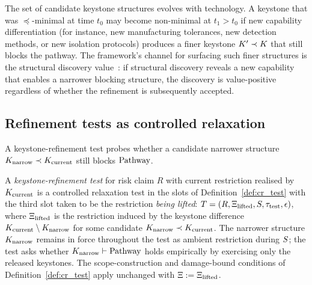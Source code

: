 \begin{remark}
\label{rem:technology_drift}
The set of candidate keystone structures evolves with technology.
A keystone that was $\preceq$-minimal at time $t_0$ may become
non-minimal at $t_1 > t_0$ if new capability differentiation
(for instance, new manufacturing tolerances, new detection
methods, or new isolation protocols) produces a finer keystone
$K' \prec K$ that still blocks the
pathway.  The framework's channel for surfacing such finer
structures is the structural discovery
value~\citep[Proposition~2]{lasser2026horizon}: if structural
discovery reveals a new capability that enables a narrower
blocking structure, the discovery is value-positive regardless of
whether the refinement is subsequently accepted.
\end{remark}

\subsection{Refinement tests as controlled relaxation}

A keystone-refinement test probes whether a candidate narrower
structure $K_{\mathrm{narrow}} \prec
K_{\mathrm{current}}$ still blocks $\mathrm{Pathway}$.

\begin{definition}
\label{def:refinement_test}
A \emph{keystone-refinement test} for risk claim $R$ with current
restriction realised by $K_{\mathrm{current}}$ is a
controlled relaxation test in the slots of
Definition~\ref{def:cr_test} with the third slot taken to be the
restriction \emph{being lifted}:
$T = (R, \Xi_{\mathrm{lifted}}, S, \tau_{\mathrm{test}},
\epsilon)$, where
$\Xi_{\mathrm{lifted}}$ is the restriction induced by the
keystone difference
$K_{\mathrm{current}} \setminus
K_{\mathrm{narrow}}$ for some candidate
$K_{\mathrm{narrow}} \prec
K_{\mathrm{current}}$.  The narrower structure
$K_{\mathrm{narrow}}$ remains in force throughout
the test as ambient restriction during $S$; the test asks
whether $K_{\mathrm{narrow}} \vdash \mathrm{Pathway}$ holds
empirically by exercising only the released keystones.  The
scope-construction and damage-bound conditions of
Definition~\ref{def:cr_test} apply unchanged with
$\Xi := \Xi_{\mathrm{lifted}}$.
\end{definition}


